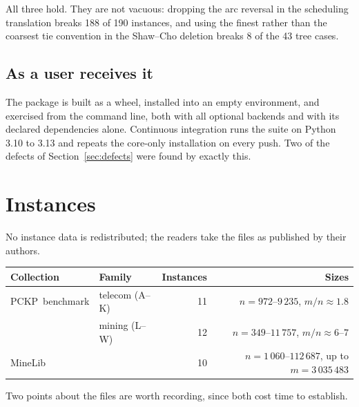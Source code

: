 \documentclass[11pt,a4paper]{article}
\newcommand{\PCKP}{\textsc{PCKP}}
\begin{document}
All three hold. They are not vacuous: dropping the arc reversal in the
scheduling translation breaks 188 of 190 instances, and using the finest
rather than the coarsest tie convention in the Shaw--Cho deletion breaks 8 of
the 43 tree cases.

\subsection{As a user receives it}

The package is built as a wheel, installed into an empty environment, and
exercised from the command line, both with all optional backends and with its
declared dependencies alone. Continuous integration runs the suite on Python
3.10 to 3.13 and repeats the core-only installation on every push. Two of the
defects of Section~\ref{sec:defects} were found by exactly this.

\section{Instances}
\label{sec:instances}

No instance data is redistributed; the readers take the files as published by
their authors.

\begin{center}
\begin{tabular}{@{}llrr@{}}
\toprule
\textbf{Collection} & \textbf{Family} & \textbf{Instances} & \textbf{Sizes}\\
\midrule
\PCKP\ benchmark & telecom (A--K) & 11 & $n=972$--$9\,235$, $m/n\approx1.8$\\
                 & mining (L--W)  & 12 & $n=349$--$11\,757$, $m/n\approx6$--$7$\\
MineLib          &                & 10 & $n=1\,060$--$112\,687$, up to $m=3\,035\,483$\\
\bottomrule
\end{tabular}
\end{center}

Two points about the files are worth recording, since both cost time to
establish.
\end{document}
